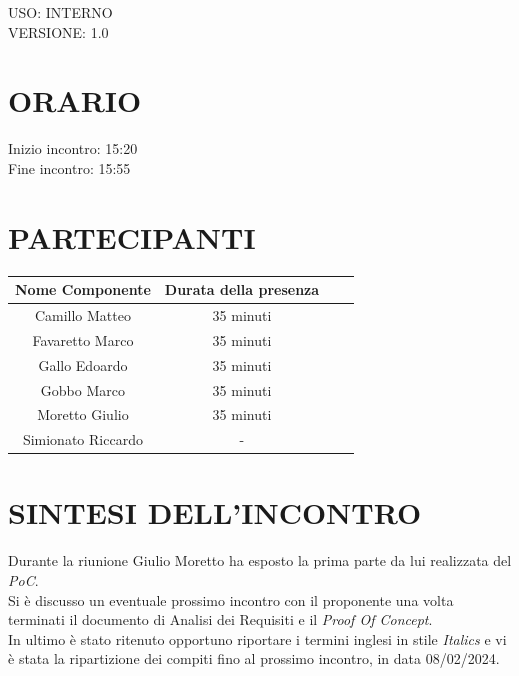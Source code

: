 \documentclass[5pt]{article}
\begin{document}
\begin{flushright}
    \begin{spacing}{1}
        USO: INTERNO\\
        VERSIONE: 1.0\\ %
    \end{spacing}
\end{flushright}


\restoregeometry

\pagebreak


\section{\Large ORARIO}
\begin{spacing}{1.5}
    {\large Inizio incontro: 15:20}\\
    {\large Fine incontro: 15:55}
\end{spacing}

\section{PARTECIPANTI}
\setlength\cellspacetoplimit{6pt}
\setlength\cellspacebottomlimit{6pt}

\begin{table}[ht]
  \begin{tabular}{|Sc|Sc|}
    \hline
    \textbf{Nome Componente} & \textbf{Durata della presenza} \\
    \hline
    Camillo Matteo & 35 minuti \\
    Favaretto Marco & 35 minuti \\
    Gallo Edoardo & 35 minuti \\
    Gobbo Marco & 35 minuti \\
    Moretto Giulio & 35 minuti \\
    Simionato Riccardo & - \\
    \hline
  \end{tabular}
  \label{tab:conference}
\end{table}

\section{SINTESI DELL'INCONTRO}
Durante la riunione Giulio Moretto ha esposto la prima parte da lui realizzata del \textit{PoC}. \\
Si è discusso un eventuale prossimo incontro con il proponente una volta terminati il documento di Analisi dei Requisiti e il \textit{Proof Of Concept}. \\
In ultimo è stato ritenuto opportuno riportare i termini inglesi in stile \textit{Italics} e vi è stata la ripartizione dei compiti fino al prossimo incontro, in data 08/02/2024.
\end{document}
